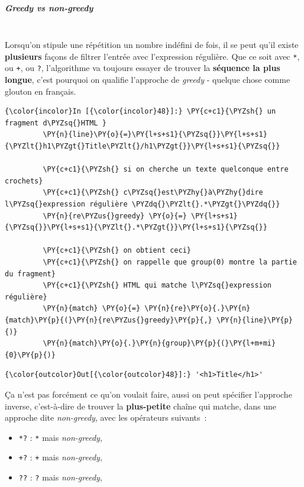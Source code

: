     \hypertarget{greedy-vs-non-greedy}{%
\subparagraph{\texorpdfstring{Greedy \emph{vs}
non-greedy}{Greedy vs non-greedy}\\\\}\label{greedy-vs-non-greedy}}

    Lorsqu'on stipule une répétition un nombre indéfini de fois, il se peut
qu'il existe \textbf{plusieurs} façons de filtrer l'entrée avec
l'expression régulière. Que ce soit avec \texttt{*}, ou \texttt{+}, ou
\texttt{?}, l'algorithme va toujours essayer de trouver la
\textbf{séquence la plus longue}, c'est pourquoi on qualifie l'approche
de \emph{greedy} - quelque chose comme glouton en français.

    \begin{Verbatim}[commandchars=\\\{\}]
{\color{incolor}In [{\color{incolor}48}]:} \PY{c+c1}{\PYZsh{} un fragment d\PYZsq{}HTML }
         \PY{n}{line}\PY{o}{=}\PY{l+s+s1}{\PYZsq{}}\PY{l+s+s1}{\PYZlt{}h1\PYZgt{}Title\PYZlt{}/h1\PYZgt{}}\PY{l+s+s1}{\PYZsq{}}
         
         \PY{c+c1}{\PYZsh{} si on cherche un texte quelconque entre crochets}
         \PY{c+c1}{\PYZsh{} c\PYZsq{}est\PYZhy{}à\PYZhy{}dire l\PYZsq{}expression régulière \PYZdq{}\PYZlt{}.*\PYZgt{}\PYZdq{}}
         \PY{n}{re\PYZus{}greedy} \PY{o}{=} \PY{l+s+s1}{\PYZsq{}}\PY{l+s+s1}{\PYZlt{}.*\PYZgt{}}\PY{l+s+s1}{\PYZsq{}}
         
         \PY{c+c1}{\PYZsh{} on obtient ceci}
         \PY{c+c1}{\PYZsh{} on rappelle que group(0) montre la partie du fragment}
         \PY{c+c1}{\PYZsh{} HTML qui matche l\PYZsq{}expression régulière}
         \PY{n}{match} \PY{o}{=} \PY{n}{re}\PY{o}{.}\PY{n}{match}\PY{p}{(}\PY{n}{re\PYZus{}greedy}\PY{p}{,} \PY{n}{line}\PY{p}{)}
         \PY{n}{match}\PY{o}{.}\PY{n}{group}\PY{p}{(}\PY{l+m+mi}{0}\PY{p}{)}
\end{Verbatim}


\begin{Verbatim}[commandchars=\\\{\}]
{\color{outcolor}Out[{\color{outcolor}48}]:} '<h1>Title</h1>'
\end{Verbatim}
\newpage
            
    Ça n'est pas forcément ce qu'on voulait faire, aussi on peut spécifier
l'approche inverse, c'est-à-dire de trouver la \textbf{plus-petite}
chaîne qui matche, dans une approche dite \emph{non-greedy}, avec les
opérateurs suivants~:

\begin{itemize}
	\item 
	\texttt{*?} : \texttt{*} mais \emph{non-greedy},
	\item
	\texttt{+?} : \texttt{+} mais \emph{non-greedy},
	\item
	\texttt{??} : \texttt{?} mais \emph{non-greedy},
\end{itemize}

